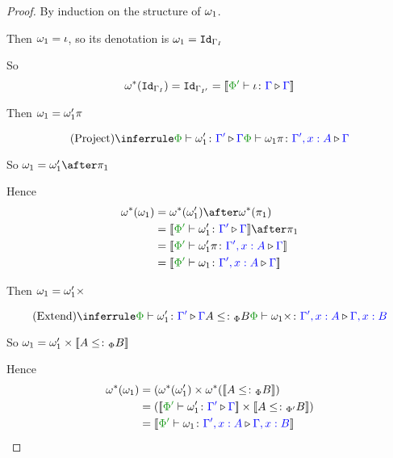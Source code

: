 \documentclass{report}
\begin{document}
\begin{framed}
    \begin{proof}
        
        By induction on the structure of $\omega_1$.
        
        Then $\omega_1 = \iota$, so its denotation is $\omega_1 = \texttt{Id}_{\Gamma_I}$
        
        So
        \begin{equation}
          \w\star(\Id{\G_I}) = \Id{\G_{I'}} = \deno{\ewrel{\P'}{\i}{\G}{\G}}  
        \end{equation}
        
        Then $\omega_1 = \omega_1'\pi$
        
        \begin{equation}
            \ntreeruleI{Project}{\ewrel{\P}{\w_1'}{\G'}{\G}}{\ewrel{\P}{\w_1\pi}{\G',x:A}{\G}}
        \end{equation}
        
        So $\w_1 = \w_1'\after\p$
        
        Hence
        \begin{align*}
            \w\star(\w_1) &= \w\star(\w_1')\after\w\star(\p)\\
            & = \deno{\ewrel{\P'}{\w_1'}{\G'}{\G}}\after\p\\
            & = \deno{\ewrel{\P'}{\w_1'\pi}{\G',x:A}{\G}}\\
            & = \deno{\ewrel{\P'}{\w_1}{\G', x:A}{\G}}
        \end{align*}
        
        Then $\omega_1 = \omega_1'\times$
        
        \begin{equation}
            \ntreeruleII{Extend}{\ewrel{\P}{\w_1'}{\G'}{\G}}{ A\subtypep B}{\ewrel{\P}{\w_1\x}{\G',x:A}{\G, x:B}}
        \end{equation}
        
        So $\omega_1 = \omega_1'\times{\bf [\![}A\leq\colon_\Phi B{\bf ]\!]}$
        
        Hence
        \begin{align*}
            \w\star(\w_1) &=(\w\star(\w_1')\times\w\star(\deno{A\subtypep B})\\
            & = (\deno{\ewrel{\P'}{\w_1'}{\G'}{\G}}\times\deno{A\subtypepp B})\\
            & = \deno{\ewrel{\P'}{\w_1}{\G',x:A}{\G,x:B}}
        \end{align*}
    \end{proof}
\end{framed}
\end{document}
